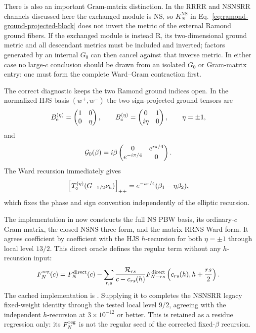 \documentclass[11pt]{article}
\newcommand{\NS}{\mathrm{NS}}
\begin{document}
There is also an important Gram-matrix distinction.  In the RRRR and
NSNSRR channels discussed here the exchanged module is NS, so
$K_N^{\NS}$ in Eq.~\eqref{eq:ramond-ground-projected-block} does not
invert the metric of the external Ramond ground fibers.  If the exchanged
module is instead R, its two-dimensional ground metric and all descendant
metrics must be included and inverted; factors generated by an internal
$G_0$ can then cancel against that inverse metric.  In either case no
large-$c$ conclusion should be drawn from an isolated $G_0$ or Gram-matrix
entry: one must form the complete Ward--Gram contraction first.

The correct diagnostic keeps the two Ramond ground indices open.  In the
normalized HJS basis $(w^+,w^-)$ the two sign-projected ground tensors are
\begin{equation}
 B_{\rm e}^{(\eta)}
 =\begin{pmatrix}1&0\\0&\eta\end{pmatrix},
 \qquad
 B_{\rm o}^{(\eta)}
 =\begin{pmatrix}0&1\\i\eta&0\end{pmatrix},
 \qquad \eta=\pm1,
 \label{eq:ramond-ground-seed-matrices}
\end{equation}
and
\begin{equation}
 {\cal G}_0(\beta)
 =i\beta
 \begin{pmatrix}
 0&e^{i\pi/4}\\ e^{-i\pi/4}&0
 \end{pmatrix}.
 \label{eq:ramond-g0-ground-matrix}
\end{equation}
The Ward recursion immediately gives
\begin{equation}
 \left[
 T_{\rm o}^{(\eta)}(G_{-1/2}\nu_h)
 \right]_{++}
 =e^{-i\pi/4}(\beta_1-\eta\beta_2),
 \label{eq:ramond-ground-matrix-anchor}
\end{equation}
which fixes the phase and sign convention independently of the elliptic
recursion.

The implementation in
 now constructs the full NS PBW
basis, its ordinary-$c$ Gram matrix, the closed NSNS three-form, and the
matrix RRNS Ward form.  It agrees coefficient by coefficient with the HJS
$h$-recursion for both $\eta=\pm1$ through local level $13/2$.  This direct
oracle defines the regular term without any $h$-recursion input:
\begin{equation}
 F_N^{\rm reg}(c)
 =F_N^{\rm direct}(c)
 -\sum_{r,s}
 \frac{\mathcal R_{rs}}{c-c_{rs}(h)}
 F_{N-rs}^{\rm direct}
 \left(c_{rs}(h),h+\frac{rs}{2}\right).
 \label{eq:direct-ramond-c-regular-seed}
\end{equation}
The cached implementation is
.  Supplying it to
 completes the NSNSRR
legacy fixed-weight identity through the tested local level $9/2$, agreeing
with the independent $h$-recursion at $3\times10^{-12}$ or better.  This is
retained as a residue regression only: its \(F_N^{\rm reg}\) is not the
regular seed of the corrected fixed-\(\beta\) recursion.
\end{document}
